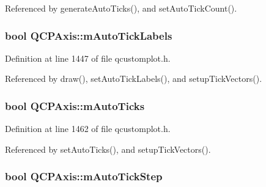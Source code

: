 Referenced by generate\+Auto\+Ticks(), and set\+Auto\+Tick\+Count().

\hypertarget{class_q_c_p_axis_a721e496b342f272078c5ff84564e472f}{}
\subsubsection[{m\+Auto\+Tick\+Labels}]{\setlength{\rightskip}{0pt plus 5cm}bool Q\+C\+P\+Axis\+::m\+Auto\+Tick\+Labels\hspace{0.3cm}{\ttfamily [protected]}}\label{class_q_c_p_axis_a721e496b342f272078c5ff84564e472f}


Definition at line 1447 of file qcustomplot.\+h.



Referenced by draw(), set\+Auto\+Tick\+Labels(), and setup\+Tick\+Vectors().

\hypertarget{class_q_c_p_axis_aac23adcbae246bf165d4539ad65ac9f9}{}
\subsubsection[{m\+Auto\+Ticks}]{\setlength{\rightskip}{0pt plus 5cm}bool Q\+C\+P\+Axis\+::m\+Auto\+Ticks\hspace{0.3cm}{\ttfamily [protected]}}\label{class_q_c_p_axis_aac23adcbae246bf165d4539ad65ac9f9}


Definition at line 1462 of file qcustomplot.\+h.



Referenced by set\+Auto\+Ticks(), and setup\+Tick\+Vectors().

\hypertarget{class_q_c_p_axis_aada8934a5c44978653031782aa37d101}{}
\subsubsection[{m\+Auto\+Tick\+Step}]{\setlength{\rightskip}{0pt plus 5cm}bool Q\+C\+P\+Axis\+::m\+Auto\+Tick\+Step\hspace{0.3cm}{\ttfamily [protected]}}\label{class_q_c_p_axis_aada8934a5c44978653031782aa37d101}


